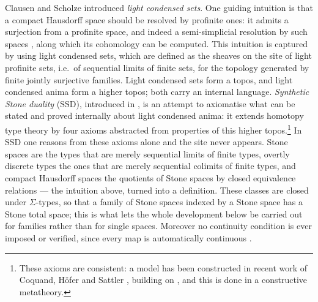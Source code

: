 Clausen and Scholze \cite{Scholze} introduced \emph{light condensed sets}. One
guiding intuition is that a compact Hausdorff space should be resolved by
profinite ones: it admits a surjection from a profinite space, and indeed a
semi-simplicial resolution by such spaces \cite{dyckhoff76-1}, along which its
cohomology can be computed.
This intuition is captured by using light condensed
sets, which are defined as the sheaves on the site of light profinite sets, i.e.\ of sequential limits of finite sets, for
the topology generated by finite jointly surjective families. Light condensed
sets form a topos, and light condensed anima form a higher topos; both carry an
internal language. \emph{Synthetic Stone duality} (SSD), introduced in
\cite{synthetic-stone-duality}, is an attempt to axiomatise what can be stated
and proved internally about light condensed anima: it extends homotopy type
theory by four axioms abstracted from properties of this higher
topos.\footnote{These axioms are consistent: a model has been constructed in
recent work of Coquand, H\"ofer and Sattler \cite{coquand-hofer-sattler},
building on \cite{CRS21}, and this is done in a constructive metatheory.} In SSD one reasons from these axioms alone and the
site never appears. Stone spaces are the types that are merely sequential limits
of finite types, overtly discrete types the ones that are merely sequential
colimits of finite types, and compact Hausdorff spaces the quotients of Stone
spaces by closed equivalence relations --- the intuition above, turned into a
definition. These classes are closed under $\Sigma$-types, so that a family of
Stone spaces indexed by a Stone space has a Stone total space; this is what lets
the whole development below be carried out for families rather than for single
spaces. Moreover no continuity condition is ever imposed or verified, since every
map is automatically continuous \cite{synthetic-stone-duality}.

